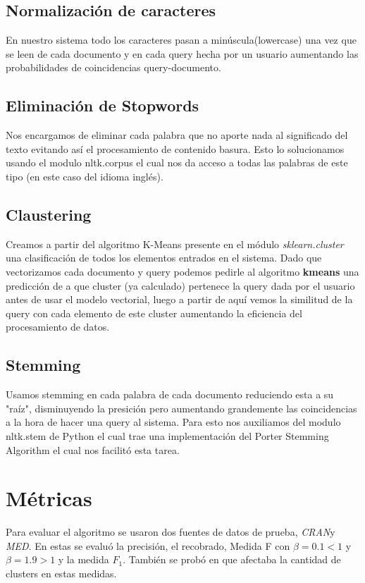 \documentclass{llncs}
\begin{document}
	
	
	
	\subsection{Normalizaci\'on de caracteres }
	
	En nuestro sistema todo los caracteres pasan a min\'uscula(lowercase) una vez que se leen de cada documento y en cada query hecha por un usuario aumentando las probabilidades de  coincidencias query-documento. 
	
	\subsection{Eliminaci\'on de Stopwords}
	Nos encargamos de eliminar cada palabra que no aporte nada al significado del texto evitando as\'i el procesamiento de contenido basura. Esto lo solucionamos usando el modulo nltk.corpus el cual nos da acceso a todas las palabras de este tipo (en este caso del idioma ingl\'es).
	
	
	\subsection{Claustering}
	Creamos a partir del algoritmo K-Means presente en el m\'odulo \textit{sklearn.cluster} una clasificaci\'on de todos los elementos entrados en el sistema. Dado que vectorizamos cada documento y query podemos pedirle al algoritmo \textbf{kmeans} una predicci\'on de a que cluster (ya calculado) pertenece la query dada por el usuario antes de usar el modelo vectorial, luego a partir de aqu\'i vemos la similitud de la query con cada elemento de este cluster aumentando la eficiencia del procesamiento de datos. 
	
	
	
	\subsection{Stemming}
	Usamos stemming en cada palabra de cada documento  reduciendo esta a su "ra\'iz", disminuyendo la presici\'on pero aumentando grandemente las coincidencias a la hora de hacer una query al sistema. Para esto nos auxiliamos del modulo nltk.stem de Python el cual trae una implementaci\'on del Porter Stemming Algorithm el cual nos facilit\'o esta tarea. 
	
	
	
	
	
	\section{M\'etricas}
	Para evaluar el algoritmo se usaron dos fuentes de datos de prueba, \textit{CRAN}y \textit{MED}. En estas se evalu\'o la precisi\'on, el recobrado, Medida F con $\beta = 0.1 < 1$ y $\beta = 1.9 > 1$ y la medida $F_1$. Tambi\'en se prob\'o en que afectaba la cantidad de clusters en estas medidas.
	
\end{document}
